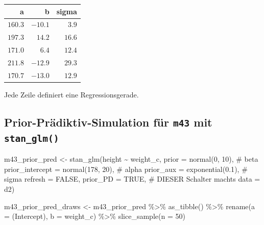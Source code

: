 \documentclass[
  a4paper,
  DIV=11]{scrreprt}
\newenvironment{Shaded}{\begin{snugshade}}{\end{snugshade}}
\newcommand{\AttributeTok}[1]{\textcolor[rgb]{0.40,0.45,0.13}{#1}}
\newcommand{\CommentTok}[1]{\textcolor[rgb]{0.37,0.37,0.37}{#1}}
\newcommand{\ConstantTok}[1]{\textcolor[rgb]{0.56,0.35,0.01}{#1}}
\newcommand{\DecValTok}[1]{\textcolor[rgb]{0.68,0.00,0.00}{#1}}
\newcommand{\FloatTok}[1]{\textcolor[rgb]{0.68,0.00,0.00}{#1}}
\newcommand{\FunctionTok}[1]{\textcolor[rgb]{0.28,0.35,0.67}{#1}}
\newcommand{\NormalTok}[1]{\textcolor[rgb]{0.00,0.23,0.31}{#1}}
\newcommand{\OtherTok}[1]{\textcolor[rgb]{0.00,0.23,0.31}{#1}}
\newcommand{\SpecialCharTok}[1]{\textcolor[rgb]{0.37,0.37,0.37}{#1}}
\newcommand{\StringTok}[1]{\textcolor[rgb]{0.13,0.47,0.30}{#1}}
\theoremstyle{definition}
\theoremstyle{remark}
\begin{document}
\begin{longtable}{rrr}
\toprule
a & b & sigma \\ 
\midrule
$160.3$ & $-10.1$ & $3.9$ \\ 
$197.3$ & $14.2$ & $16.6$ \\ 
$171.0$ & $6.4$ & $12.4$ \\ 
$211.8$ & $-12.9$ & $29.3$ \\ 
$170.7$ & $-13.0$ & $12.9$ \\ 
\bottomrule
\end{longtable}

Jede Zeile definiert eine Regressionsgerade.

\hypertarget{prior-pruxe4diktiv-simulation-fuxfcr-m43-mit-stan_glm}{%
\subsection{\texorpdfstring{Prior-Prädiktiv-Simulation für \texttt{m43}
mit
\texttt{stan\_glm()}}{Prior-Prädiktiv-Simulation für m43 mit stan\_glm()}}\label{prior-pruxe4diktiv-simulation-fuxfcr-m43-mit-stan_glm}}

\begin{Shaded}
\begin{Highlighting}[]
\NormalTok{m43\_prior\_pred }\OtherTok{\textless{}{-}}
    \FunctionTok{stan\_glm}\NormalTok{(height }\SpecialCharTok{\textasciitilde{}}\NormalTok{ weight\_c, }
             \AttributeTok{prior =} \FunctionTok{normal}\NormalTok{(}\DecValTok{0}\NormalTok{, }\DecValTok{10}\NormalTok{),  }\CommentTok{\# beta}
             \AttributeTok{prior\_intercept =} \FunctionTok{normal}\NormalTok{(}\DecValTok{178}\NormalTok{, }\DecValTok{20}\NormalTok{),  }\CommentTok{\# alpha}
             \AttributeTok{prior\_aux =} \FunctionTok{exponential}\NormalTok{(}\FloatTok{0.1}\NormalTok{),  }\CommentTok{\# sigma}
             \AttributeTok{refresh =} \ConstantTok{FALSE}\NormalTok{, }
             \AttributeTok{prior\_PD =} \ConstantTok{TRUE}\NormalTok{,  }\CommentTok{\# DIESER Schalter macht\textquotesingle{}s}
             \AttributeTok{data =}\NormalTok{ d2)}

\NormalTok{m43\_prior\_pred\_draws }\OtherTok{\textless{}{-}} 
\NormalTok{  m43\_prior\_pred }\SpecialCharTok{\%\textgreater{}\%} 
  \FunctionTok{as\_tibble}\NormalTok{() }\SpecialCharTok{\%\textgreater{}\%} 
  \FunctionTok{rename}\NormalTok{(}\AttributeTok{a =} \StringTok{\textasciigrave{}}\AttributeTok{(Intercept)}\StringTok{\textasciigrave{}}\NormalTok{,}
         \AttributeTok{b =}\NormalTok{ weight\_c) }\SpecialCharTok{\%\textgreater{}\%} 
  \FunctionTok{slice\_sample}\NormalTok{(}\AttributeTok{n =} \DecValTok{50}\NormalTok{)}
\end{Highlighting}
\end{Shaded}
\end{document}
